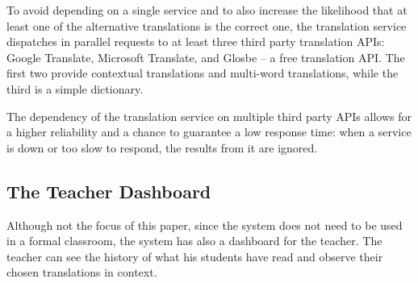 To avoid depending on a single service and to also increase the likelihood that at least one of the alternative translations is the correct one, the translation service dispatches in parallel requests to at least three third party translation APIs: Google Translate, Microsoft Translate, and Glosbe -- a free translation API. The first two provide contextual translations and multi-word translations, while the third is a simple dictionary. 

The dependency of the translation service on multiple third party APIs allows for a higher reliability and a chance to guarantee a low response time: when a service is down or too slow to respond, the results from it are ignored.

\subsection{The Teacher Dashboard}

Although not the focus of this paper, since the system does not need to be used in a formal classroom, the system has also a dashboard for the teacher. The teacher can see the history of what his students have read and observe their chosen translations in context.






